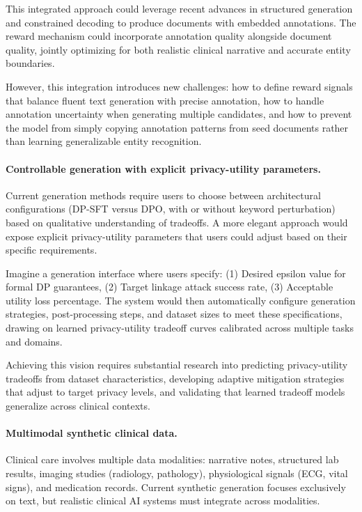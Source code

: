 This integrated approach could leverage recent advances in structured generation and constrained decoding to produce documents with embedded annotations.
The reward mechanism could incorporate annotation quality alongside document quality, jointly optimizing for both realistic clinical narrative and accurate entity boundaries.

However, this integration introduces new challenges: how to define reward signals that balance fluent text generation with precise annotation, how to handle annotation uncertainty when generating multiple candidates, and how to prevent the model from simply copying annotation patterns from seed documents rather than learning generalizable entity recognition.

\paragraph{Controllable generation with explicit privacy-utility parameters.}

Current generation methods require users to choose between architectural configurations (DP-SFT versus DPO, with or without keyword perturbation) based on qualitative understanding of tradeoffs.
A more elegant approach would expose explicit privacy-utility parameters that users could adjust based on their specific requirements.

Imagine a generation interface where users specify: (1) Desired epsilon value for formal DP guarantees, (2) Target linkage attack success rate, (3) Acceptable utility loss percentage.
The system would then automatically configure generation strategies, post-processing steps, and dataset sizes to meet these specifications, drawing on learned privacy-utility tradeoff curves calibrated across multiple tasks and domains.

Achieving this vision requires substantial research into predicting privacy-utility tradeoffs from dataset characteristics, developing adaptive mitigation strategies that adjust to target privacy levels, and validating that learned tradeoff models generalize across clinical contexts.

\paragraph{Multimodal synthetic clinical data.}

Clinical care involves multiple data modalities: narrative notes, structured lab results, imaging studies (radiology, pathology), physiological signals (ECG, vital signs), and medication records.
Current synthetic generation focuses exclusively on text, but realistic clinical AI systems must integrate across modalities.

